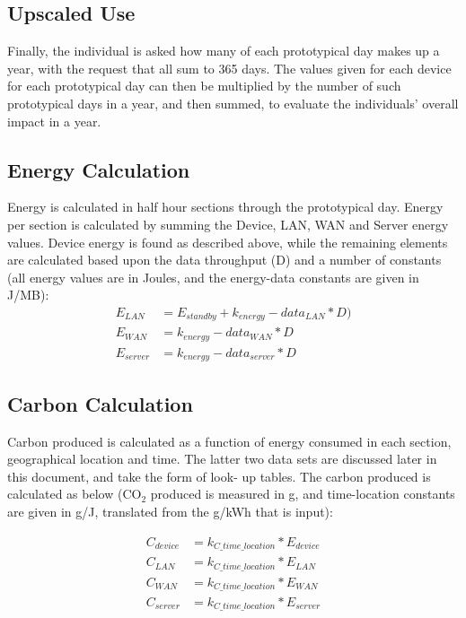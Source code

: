 \documentclass[conference]{IEEEtran}
\begin{document}
\subsection{Upscaled Use}

Finally, the individual is asked how many of each prototypical day
makes up a year, with the request that all sum to 365 days. The values
given for each device for each prototypical day can then be multiplied
by the number of such prototypical days in a year, and then summed, to
evaluate the individuals' overall impact in a year.

\subsection{Energy Calculation}

Energy is calculated in half hour sections through the prototypical
day. Energy per section is calculated by summing the Device, LAN, WAN
and Server energy values. Device energy is found as described above,
while the remaining elements are calculated based upon the data
throughput (D) and a number of constants (all energy values are in
Joules, and the energy-data constants are given in J/MB):
\begin{align*}
E_{LAN} &= E_{standby} + k_{energy}-data_{LAN} * D)\\
E_{WAN} &= k_{energy}-data_{WAN} * D\\
E_{server} &= k_{energy}-data_{server} * D
\end{align*}

\subsection{Carbon Calculation}

Carbon produced is calculated as a function of energy consumed in each
section, geographical location and time. The latter two data sets are
discussed later in this document, and take the form of look- up
tables. The carbon produced is calculated as below (CO$_2$ produced is
measured in g, and time-location constants are given in g/J,
translated from the g/kWh that is input):

\begin{align*}
C_{device} &= k_{C\_time\_location} * E_{device}\\
C_{LAN} &= k_{C\_time\_location} * E_{LAN}\\
C_{WAN} &= k_{C\_time\_location} * E_{WAN}\\
C_{server} &= k_{C\_time\_location} * E_{server}
\end{align*}
\end{document}
